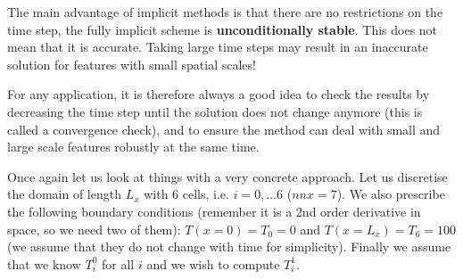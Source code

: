 The main advantage of implicit methods is that there are no restrictions on the time step,
the fully implicit scheme is {\bf unconditionally stable}.
This does not mean that it is accurate. 
Taking large time steps may result in an inaccurate solution for features with
small spatial scales!

For any application, it is therefore always a good idea to check the 
results by decreasing the time step
until the solution does not change anymore (this is called a {\color{olive}convergence check}), and 
to ensure the
method can deal with small and large scale features robustly at the same time.

Once again let us look at things with a very concrete approach. Let us discretise the 
domain of length $L_x$ with 6 cells, i.e. $i=0,\dots 6$ ($nnx=7$).
We also prescribe the following boundary conditions (remember it is a 2nd order derivative in space, 
so we need two of them): $T(x=0)=T_0=0$ and $T(x=L_x)=T_6=100$ (we assume that they 
do not change with time for simplicity). Finally we assume that we 
know $T_i^0$ for all $i$ and we wish to compute $T_i^1$.

